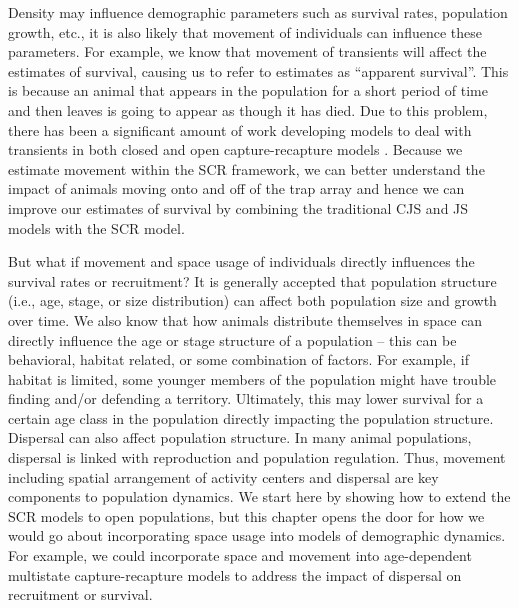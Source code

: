 Density may influence demographic parameters such as %
survival rates, population growth, etc., it is also likely that movement of individuals
can influence these parameters.  For example, we know that movement of transients will affect
the estimates of survival, causing us to refer to estimates as ``apparent survival''.
This is because an animal that appears in the population for a short period of time and then leaves
is going to appear as though it has died.  Due to this problem, there has been a significant amount
of work developing models to deal with transients in both closed and open capture-recapture models 
\citep{kendall_etal:1997, pradel_hines:1997, hines_etal:2003, clavel_etal:2008}.  Because we estimate movement
within the SCR framework, we can better understand the impact of animals moving onto and off of the trap
array and hence we can improve our estimates of survival by combining the traditional CJS and JS models with
the SCR model.

But
what if movement and space usage of individuals directly influences
the survival rates or recruitment?
It is generally accepted that population structure (i.e., age, stage, or size distribution) can affect
 both population size and growth over time.
We also know that how animals distribute themselves in space
can directly influence the age or stage structure of a population -- this can be behavioral, habitat
related, or some combination of factors.
For example, if habitat is limited, 
some younger members of the population might have trouble finding
and/or defending a territory.  Ultimately, this may lower survival for a certain age class in the population directly
impacting the population structure.
Dispersal can also affect population structure.
In many
animal populations, dispersal is linked with reproduction and
population regulation.
Thus, movement including spatial
arrangement of activity centers %
and dispersal are key components to population dynamics. We start here by showing
how to extend the SCR models to open populations, but this chapter opens the door for how we would go about
incorporating space usage into models of demographic dynamics.
For example, we could incorporate space and movement
into age-dependent multistate capture-recapture models to address
the impact of dispersal on recruitment or survival.



